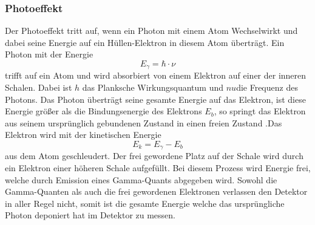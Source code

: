 \subsubsection{Photoeffekt}
Der Photoeffekt tritt auf, wenn ein Photon mit einem Atom Wechselwirkt und dabei seine Energie auf ein Hüllen-Elektron in diesem Atom 
überträgt. Ein Photon mit der Energie 
\begin{equation}
     E_{\gamma} = \hbar \cdot \nu 
\end{equation} 
trifft auf ein Atom und wird absorbiert von einem Elektron auf einer der inneren Schalen.
Dabei ist \( h \) das Planksche Wirkungsquantum und \(nu \)die Frequenz des Photons.
Das Photon überträgt seine gesamte Energie auf das Elektron, ist diese Energie größer als die Bindungsenergie des Elektrons $E_b$, so springt das 
Elektron aus seinem ursprünglich gebundenen Zustand in einen freien Zustand .Das Elektron wird mit der kinetischen Energie 
\begin{equation}
    E_k=E_{\gamma}-E_b 
\end{equation} 
aus dem Atom geschleudert. Der frei gewordene Platz auf der Schale wird durch ein Elektron einer höheren Schale aufgefüllt. Bei diesem Prozess wird Energie frei, 
welche durch Emission eines Gamma-Quants abgegeben wird. Sowohl die Gamma-Quanten als auch die frei gewordenen Elektronen verlassen den Detektor in aller Regel nicht,
somit ist die gesamte Energie welche das ursprüngliche Photon deponiert hat im Detektor zu messen.

\cite{Strahlung_Arten}
